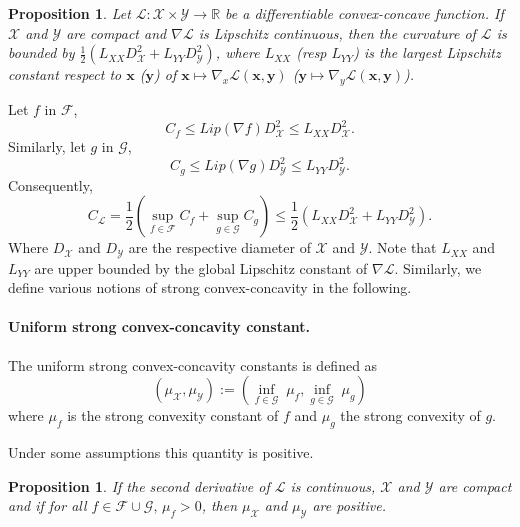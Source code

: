 \documentclass[twoside]{article}
\newcommand{\R}{\mathbb{R}}
\renewcommand{\L}{\mathcal{L}}
\newcommand{\X}{\mathcal{X}}
\newcommand{\Y}{\mathcal{Y}}
\newcommand{\M}{\X \times \Y}
\newcommand{\x}{\bm{x}}
\newcommand{\y}{\bm{y}}
\newtheorem{proposition}[definition]{Proposition}
\newcommand{\0}{\mathbf{0}} %
\begin{document}
  \begin{proposition}\label{prop:Cbounded}
    Let $\L: \M \to \R$ be a differentiable convex-concave function. If $\X$ and $\Y$ are compact and $\nabla\L$ is Lipschitz continuous, then the curvature of $\L$ is bounded by $\frac{1}{2}(L_{XX} D_\X^2+L_{YY}D_\Y^2)$, where $L_{XX}$ (resp $L_{YY}$) is the largest Lipschitz constant respect to $\x$ ($\y$) of $\x \mapsto \nabla_x \L(\x,\y)$ ($\y \mapsto \nabla_y \L(\x,\y)$).
  \end{proposition}
  \proof
    Let $f$ in $\mathcal{F}$,
    \begin{equation}
     C_f \leq Lip(\nabla f) D_\X^2 \leq L_{XX} D_\X^2.
     \end{equation}
     Similarly, let $g$ in $\mathcal{G}$,
     \begin{equation}
     C_g \leq Lip(\nabla g) D_\Y^2 \leq L_{YY} D_\Y^2.
     \end{equation}
     Consequently,
     \begin{equation}
     C_\L = \frac{1}{2}(\underset{f \in \mathcal{F}}{\sup} C_f + \underset{g \in \mathcal{G}}{\sup} C_g) \leq \frac{1}{2} (L_{XX}D_\X^2 + L_{YY} D_\Y^2).
     \end{equation} 
     Where $D_\X$ and $D_\Y$ are the respective diameter of $\X$ and $\Y$.
  \endproof
  Note that $L_{XX}$ and $L_{YY}$ are upper bounded by the global Lipschitz constant of $\nabla \L$.
  Similarly, we define various notions of strong convex-concavity in the following.
\paragraph{Uniform strong convex-concavity constant.} %
\label{par:uniform_strong_convex_concavity_constant}
%
    The uniform strong convex-concavity constants is defined as 
    \begin{equation}
  \label{def:strongL}
      (\mu_\X,\mu_\Y) := \left(\underset{f \in \mathcal{G}}
        {\inf} \; \mu_f,\underset{g \in \mathcal{G}}
        {\inf} \; \mu_g\right)
    \end{equation}
    where $\mu_f$ is the strong convexity constant of $f$ and $\mu_g$ the strong convexity of $g$.


  Under some assumptions this quantity is positive.

      
  \begin{proposition} \label{prop:strongpos}
    If the second derivative of $\L$ is continuous, $\X$ and $\Y$ are compact and if for all $f \in \mathcal{F}\cup \mathcal G, \,\mu_f >0$, then
     $\mu_\X$ and $\mu_\Y$ are positive.  
  \end{proposition}
\end{document}
